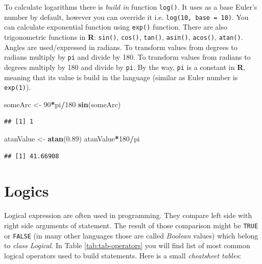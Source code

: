 \documentclass[]{book}
\newenvironment{Shaded}{\begin{snugshade}}{\end{snugshade}}
\newcommand{\KeywordTok}[1]{\textcolor[rgb]{0.13,0.29,0.53}{\textbf{#1}}}
\newcommand{\DecValTok}[1]{\textcolor[rgb]{0.00,0.00,0.81}{#1}}
\newcommand{\FloatTok}[1]{\textcolor[rgb]{0.00,0.00,0.81}{#1}}
\newcommand{\StringTok}[1]{\textcolor[rgb]{0.31,0.60,0.02}{#1}}
\newcommand{\OperatorTok}[1]{\textcolor[rgb]{0.81,0.36,0.00}{\textbf{#1}}}
\newcommand{\NormalTok}[1]{#1}
\theoremstyle{definition}
\theoremstyle{definition}
\theoremstyle{definition}
\theoremstyle{remark}
\begin{document}
To calculate logarithms there is \emph{build in} function
\texttt{log()}. It uses as a base Euler's number by default, however you
can override it i.e. \texttt{log(10,\ base\ =\ 10)}. You can calculate
exponential function using \texttt{exp()} function. There are also
trigonometric functions in \textbf{R}: \texttt{sin()}, \texttt{cos()},
\texttt{tan()}, \texttt{asin()}, \texttt{acos()}, \texttt{atan()}.
Angles are used/expressed in radians. To transform values from degrees
to radians multiply by \texttt{pi} and divide by 180. To transform
values from radians to degrees multiply by 180 and divide by
\texttt{pi}. By the way, \texttt{pi} is a constant in \textbf{R},
meaning that its value is build in the language (similar as Euler number
is \texttt{exp(1)}).

\begin{Shaded}
\begin{Highlighting}[]
\NormalTok{someArc <-}\StringTok{ }\DecValTok{90}\OperatorTok{*}\NormalTok{pi}\OperatorTok{/}\DecValTok{180}
\KeywordTok{sin}\NormalTok{(someArc)}
\end{Highlighting}
\end{Shaded}

\begin{verbatim}
## [1] 1
\end{verbatim}

\begin{Shaded}
\begin{Highlighting}[]
\NormalTok{atanValue <-}\StringTok{ }\KeywordTok{atan}\NormalTok{(}\FloatTok{0.89}\NormalTok{)}
\NormalTok{atanValue}\OperatorTok{*}\DecValTok{180}\OperatorTok{/}\NormalTok{pi}
\end{Highlighting}
\end{Shaded}

\begin{verbatim}
## [1] 41.66908
\end{verbatim}

\section{Logics}\label{logics}

Logical expression are often used in programming. They compare left side
with right side arguments of statement. The result of those comparison
might be \texttt{TRUE} or \texttt{FALSE} (in many other languages those
are called \emph{Boolean} values) which belong to \emph{class Logical}.
In Table \ref{tab:tab-operators} you will find list of most common
logical operators used to build statements. Here is a small
\emph{cheatsheet tables}:
\end{document}
